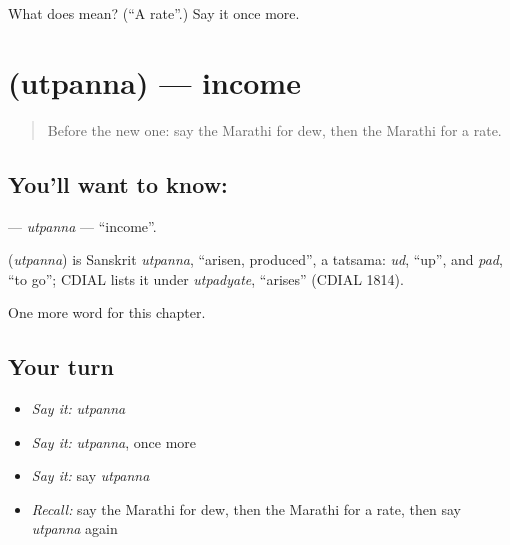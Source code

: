\begin{tcolorbox}[breakable,colback=teal!4,colframe=teal!35!black,title={Before you move on}]
What does  mean? (\textquotedblleft{}A rate\textquotedblright{}.) Say it once more.
\end{tcolorbox}
\section[\texorpdfstring{\mr{उत्पन्न} (utpanna)}{उत्पन्न (utpanna)}]{ (utpanna) — income}

\label{lesson:MR-C219-utpanna}



\begin{quote}
Before the new one: say the Marathi for dew, then the Marathi for a rate.
\end{quote}

\subsection*{You'll want to know: }
\textbf{} — \emph{utpanna} — \textquotedblleft{}income\textquotedblright{}.

\begin{cousinweb}
\textbf{} (\emph{utpanna}) is Sanskrit \emph{utpanna}, \textquotedblleft{}arisen, produced\textquotedblright{}, a tatsama: \emph{ud}, \textquotedblleft{}up\textquotedblright{}, and \emph{pad}, \textquotedblleft{}to go\textquotedblright{}; CDIAL lists it under \emph{utpadyate}, \textquotedblleft{}arises\textquotedblright{} (CDIAL 1814).
\end{cousinweb}

\begin{grammarlens}[title={What you've built}]
One more word for this chapter.
\end{grammarlens}

\subsection*{Your turn}
\begin{itemize}
\raggedright
  \item \emph{Say it:} \emph{utpanna}
  \item \emph{Say it:} \emph{utpanna}, once more
  \item \emph{Say it:} say \emph{utpanna}
  \item \emph{Recall:} say the Marathi for dew, then the Marathi for a rate, then say \emph{utpanna} again
\end{itemize}

